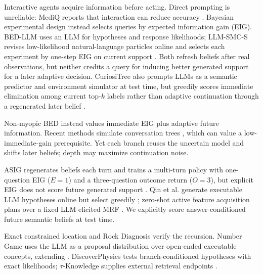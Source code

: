 \documentclass[10pt]{article}
\begin{document}
Interactive agents acquire information before acting. Direct prompting is unreliable:
MediQ reports that interaction can reduce accuracy \citep{li2024mediq}. Bayesian
experimental design instead selects queries by expected information gain (EIG).
BED-LLM uses an LLM for hypotheses and response likelihoods; LLM-SMC-S revises
low-likelihood natural-language particles online and selects each experiment by
one-step EIG on current support \citep{choudhury2025bedllm,piriyakulkij2024experiments}.
Both refresh beliefs after real observations, but neither credits a query for
inducing better generated support for a later adaptive decision.
CuriosiTree also prompts LLMs as a semantic predictor and environment simulator
at test time, but greedily scores immediate elimination among current top-$k$
labels rather than adaptive continuation through a regenerated later belief
\citep{cooper2025curiositree}.

Non-myopic BED instead values immediate EIG plus adaptive future information.
Recent methods simulate conversation trees \citep{hu2024uot,arnould2026cabed},
which can value a low-immediate-gain prerequisite. Yet each branch reuses the
uncertain model and shifts later beliefs; depth may maximize continuation noise.

ASIG regenerates beliefs each turn and trains a multi-turn policy with
one-question EIG ($E{=}1$) and a three-question outcome return ($O{=}3$), but
explicit EIG does not score future generated support \citep{hartmann2026asig}.
Qin et al. generate executable LLM hypotheses online but select greedily
\citep{qin2026box}; zero-shot active feature acquisition plans over a fixed
LLM-elicited MRF \citep{perets2026afa}. We explicitly score answer-conditioned
future semantic beliefs at test time.

Exact constrained location and Rock Diagnosis verify the recursion. Number Game
uses the LLM as a proposal distribution over open-ended executable concepts,
extending \citet{chari2026wild}. DiscoverPhysics tests branch-conditioned
hypotheses with exact likelihoods; $\tau$-Knowledge supplies external retrieval
endpoints \citep{shi2026tau}.
\end{document}
